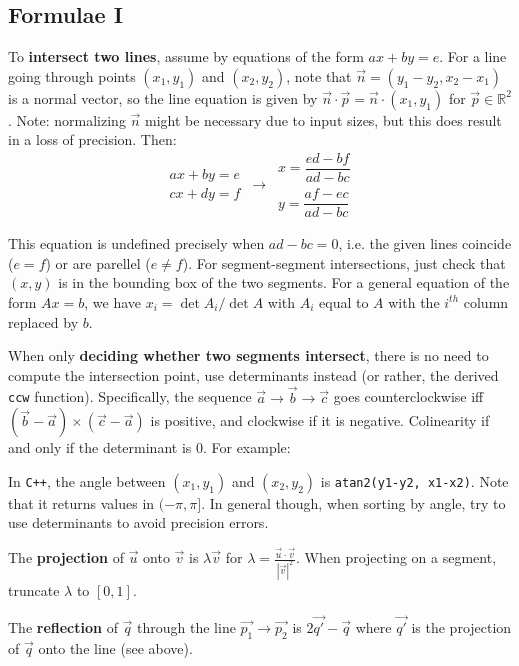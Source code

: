 \documentclass[
	a4paper,
	landscape,
	10pt,
	article
]{article}
\begin{document}
\subsection{Formulae I}
To \textbf{intersect two lines}, assume by equations of the form
$ax + by = e$. For a line going through points $(x_1, y_1)$ and
$(x_2, y_2)$, note that $\vec{n} = (y_1 - y_2, x_2 - x_1)$ is a normal vector,
so the line equation is given by $\vec{n}\cdot\vec{p}
	 = \vec{n} \cdot (x_1, y_1)$ for
$\vec{p} \in \mathbb{R}^2$. Note: normalizing $\vec{n}$ might be necessary due
to input sizes, but this does result in a loss of precision. Then:
$$\begin{aligned}ax+by=e\\cx+dy=f\end{aligned}
\,\to\,
\begin{aligned}x=\dfrac{ed-bf}{ad-bc}\\y=\dfrac{af-ec}{ad-bc}\end{aligned}$$

This equation is undefined precisely when $ad-bc = 0$, i.e. the given lines
coincide ($e=f$) or are parellel ($e \neq f$). For segment-segment
intersections, just check that $(x, y)$ is in the bounding box of the two
segments.
For a general equation of the form $Ax = b$, we have $x_i = \det A_i / \det A$
with $A_i$ equal to $A$ with the $i^{th}$ column replaced by $b$.

When only \textbf{deciding whether two segments intersect}, there is no need
to compute the intersection point, use determinants instead (or rather,
the derived \texttt{ccw} function). Specifically, the sequence $\vec{a}
	\to \vec{b} \to \vec{c}$ goes counterclockwise iff
$(\vec{b}-\vec{a})\times(\vec{c}-\vec{a})$ is positive, and clockwise if it
is negative. Colinearity if and only if the determinant is $0$. For example:



In \texttt{C++}, the angle between $(x_1, y_1)$ and $(x_2, y_2)$ is
\texttt{atan2(y1-y2, x1-x2)}. Note that it returns values in
$(-\pi, \pi]$. In general though, when sorting by angle, try to use
determinants to avoid precision errors.

The \textbf{projection} of $\vec{u}$ onto $\vec{v}$ is
$\lambda\vec{v}$ for $\lambda = \frac{\vec{u}\cdot\vec{v}}{|\vec{v}|^2}$.
When projecting on a segment, truncate $\lambda$ to $[0, 1]$.

The \textbf{reflection} of $\vec{q}$ through the line $\vec{p_1}\to\vec{p_2}$
is $2\vec{q'} - \vec{q}$ where $\vec{q'}$ is the projection of $\vec{q}$ onto
the line (see above).
\end{document}

